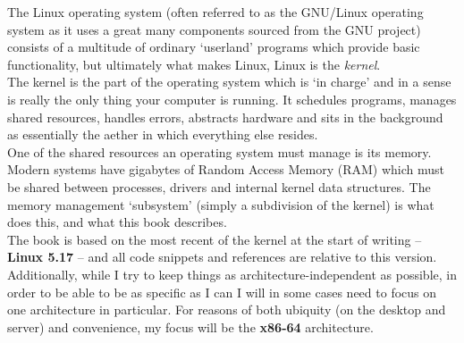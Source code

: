 The Linux operating system (often referred to as the GNU/Linux operating system
as it uses a great many components sourced from the GNU project) consists of a
multitude of ordinary `userland' programs which provide basic functionality, but
ultimately what makes Linux, Linux is the \emph{kernel}.\\

The kernel is the part of the operating system which is `in charge' and in a
sense is really the only thing your computer is running. It schedules programs,
manages shared resources, handles errors, abstracts hardware and sits in the
background as essentially the aether in which everything else resides.\\

One of the shared resources an operating system must manage is its
memory. Modern systems have gigabytes of Random Access Memory (RAM) which must
be shared between processes, drivers and internal kernel data structures. The
memory management `subsystem' (simply a subdivision of the kernel) is what
does this, and what this book describes.\\

The book is based on the most recent of the kernel at the start of writing --
\textbf{Linux 5.17} -- and all code snippets and references are relative to this
version. Additionally, while I try to keep things as architecture-independent as
possible, in order to be able to be as specific as I can I will in some cases
need to focus on one architecture in particular. For reasons of both ubiquity
(on the desktop and server) and convenience, my focus will be the
\textbf{x86-64} architecture.\\
